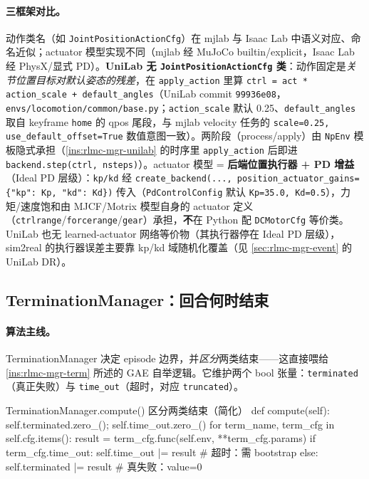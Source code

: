 \paragraph{三框架对比。}动作类名（如 \verb|JointPositionActionCfg|）在 mjlab 与 Isaac Lab 中语义对应、命名近似；actuator 模型实现不同（mjlab 经 MuJoCo builtin/explicit，Isaac Lab 经 PhysX/显式 PD）。\textbf{UniLab 无 \texttt{JointPositionActionCfg} 类}：动作固定是\emph{关节位置目标对默认姿态的残差}，在 \verb|apply_action| 里算 \verb|ctrl = act * action_scale + default_angles|（UniLab commit \texttt{99936e08}，\texttt{envs/locomotion/common/base.py}；\verb|action_scale| 默认 0.25、\verb|default_angles| 取自 keyframe \verb|home| 的 qpos 尾段，与 mjlab velocity 任务的 \verb|scale=0.25, use_default_offset=True| 数值意图一致）。两阶段（process/apply）由 \verb|NpEnv| 模板隐式承担（\cref{ins:rlmc-mgr-unilab} 的时序里 \verb|apply_action| 后即进 \verb|backend.step(ctrl, nsteps)|）。actuator 模型 = \textbf{后端位置执行器 + PD 增益}（Ideal PD 层级）：\verb|kp/kd| 经 \verb|create_backend(..., position_actuator_gains={"kp": Kp, "kd": Kd})| 传入（\verb|PdControlConfig| 默认 \verb|Kp=35.0, Kd=0.5|），力矩/速度饱和由 MJCF/Motrix 模型自身的 actuator 定义（\verb|ctrlrange|/\verb|forcerange|/\verb|gear|）承担，\textbf{不}在 Python 配 \verb|DCMotorCfg| 等价类。UniLab 也无 learned-actuator 网络等价物（其执行器停在 Ideal PD 层级），sim2real 的执行器误差主要靠 kp/kd 域随机化覆盖（见 \cref{sec:rlmc-mgr-event} 的 UniLab DR）。

\subsection{TerminationManager：回合何时结束}
\label{sec:rlmc-mgr-term}

\paragraph{算法主线。}TerminationManager 决定 episode 边界，并\emph{区分}两类结束——这直接喂给 \cref{ins:rlmc-mgr-term} 所述的 GAE 自举逻辑。它维护两个 bool 张量：\verb|terminated|（真正失败）与 \verb|time_out|（超时，对应 \verb|truncated|）。

\begin{codebox}[Python]{TerminationManager.compute() 区分两类结束（简化）}
def compute(self):
    self.terminated.zero_(); self.time_out.zero_()
    for term_name, term_cfg in self.cfg.items():
        result = term_cfg.func(self.env, **term_cfg.params)
        if term_cfg.time_out:
            self.time_out |= result        # 超时：需 bootstrap
        else:
            self.terminated |= result      # 真失败：value=0
\end{codebox}

